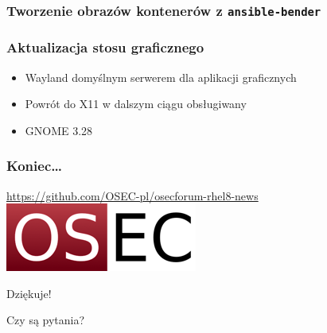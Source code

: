 \documentclass[dvipsnames,table]{beamer}
\begin{document}
\begin{frame}[fragile]
	\frametitle{Tworzenie obrazów kontenerów z {\tt ansible-bender}}

\end{frame}

\begin{frame}[fragile]
	\frametitle{Aktualizacja stosu graficznego}
\begin{itemize}
	\item{Wayland domyślnym serwerem dla aplikacji graficznych}
	\item{Powrót do X11 w dalszym ciągu obsługiwany}
	\item{GNOME 3.28}
\end{itemize}
\end{frame}

\begin{frame}
\frametitle{Koniec\ldots}
\begin{center}
\href{https://github.com/OSEC-pl/osecforum-rhel8-news}{https://github.com/OSEC-pl/osecforum-rhel8-news}
\includegraphics[scale=0.5]{img-oseclogo.png}

Dziękuje!

Czy są pytania?

\end{center}
\end{frame}
\end{document}
